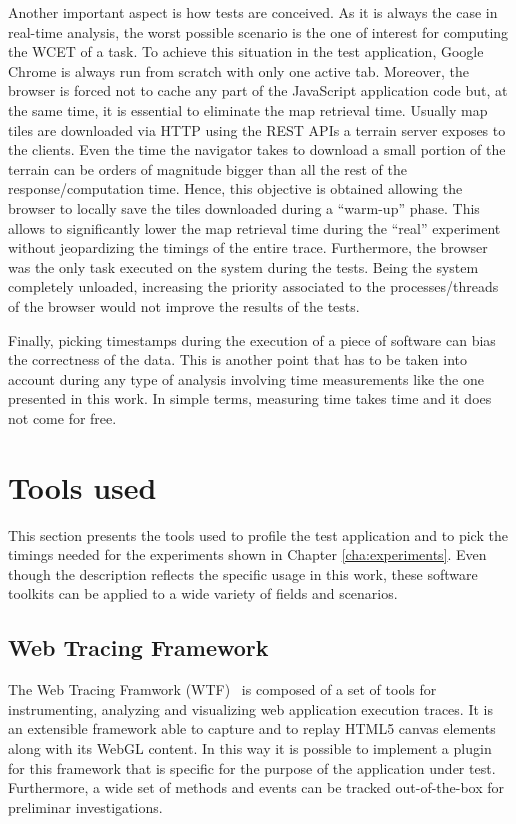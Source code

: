 Another important aspect is how tests are conceived. As it is always the case in
real-time analysis, the worst possible scenario is the one of interest for
computing the WCET of a task. To achieve this situation in the test application,
Google Chrome is always run from scratch with only one active tab. Moreover, the browser
is forced not to cache any part of the JavaScript application code but,
at the same time, it is essential to eliminate the map retrieval time.
Usually map tiles are
downloaded via HTTP using the REST APIs a terrain server exposes to the clients.
Even the time the navigator takes to download a small portion of the terrain
can be orders of magnitude bigger than all the rest of the response/computation time.
Hence, this objective is obtained allowing the browser to locally save the
tiles downloaded during a ``warm-up'' phase. This allows to significantly lower
the map retrieval time during the ``real'' experiment without jeopardizing the
timings of the entire trace. Furthermore, the browser was the only task executed
on the system during the tests. Being the system completely unloaded, increasing
the priority associated to the processes/threads of the browser would not improve
the results of the tests.

Finally, picking timestamps during the execution of a piece of software can bias
the correctness of the data. This is another point that has to be
taken into account during any type of analysis involving time measurements like
the one presented in this work. In simple terms, measuring time takes time and
it does not come for free.


\section{Tools used}
This section presents the tools used to profile the test application and to pick
the timings needed for the experiments shown in Chapter \ref{cha:experiments}.
Even though the description reflects the specific usage in this work, these
software toolkits can be applied to a wide variety of fields and scenarios.

\subsection{Web Tracing Framework} \label{sec:wtf}
The Web Tracing Framwork (WTF)~\cite{wtf} is composed of a set of tools for
instrumenting, analyzing and visualizing web application execution traces.
It is an extensible framework able to capture and to replay HTML5 canvas elements
along with its WebGL content. In this way it is possible to implement a plugin for
this framework that is specific for the purpose of the application under test.
Furthermore, a wide set
of methods and events can be tracked out-of-the-box for preliminar investigations.

